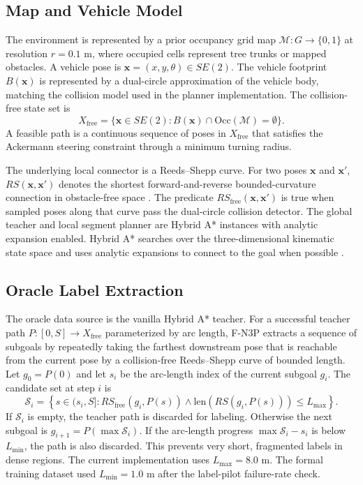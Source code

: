 \documentclass[11pt,a4paper]{article}
\begin{document}
\subsection{Map and Vehicle Model}
\label{sec:method_model}

The environment is represented by a prior occupancy grid map $\mathcal{M}: G \rightarrow \{0,1\}$ at resolution $r=0.1$ m, where occupied cells represent tree trunks or mapped obstacles. A vehicle pose is $\mathbf{x}=(x,y,\theta)\in SE(2)$. The vehicle footprint $B(\mathbf{x})$ is represented by a dual-circle approximation of the vehicle body, matching the collision model used in the planner implementation. The collision-free state set is
\begin{equation}
X_{\mathrm{free}} = \{\mathbf{x}\in SE(2): B(\mathbf{x})\cap \mathrm{Occ}(\mathcal{M})=\emptyset\}.
\end{equation}
A feasible path is a continuous sequence of poses in $X_{\mathrm{free}}$ that satisfies the Ackermann steering constraint through a minimum turning radius.

The underlying local connector is a Reeds--Shepp curve. For two poses $\mathbf{x}$ and $\mathbf{x}'$, $RS(\mathbf{x},\mathbf{x}')$ denotes the shortest forward-and-reverse bounded-curvature connection in obstacle-free space \cite{ReedsShepp1990}. The predicate $RS_{\mathrm{free}}(\mathbf{x},\mathbf{x}')$ is true when sampled poses along that curve pass the dual-circle collision detector. The global teacher and local segment planner are Hybrid A* instances with analytic expansion enabled. Hybrid A* searches over the three-dimensional kinematic state space and uses analytic expansions to connect to the goal when possible \cite{Dolgov2010HybridAstar}.

\subsection{Oracle Label Extraction}
\label{sec:method_labels}

The oracle data source is the vanilla Hybrid A* teacher. For a successful teacher path $P:[0,S]\rightarrow X_{\mathrm{free}}$ parameterized by arc length, F-N3P extracts a sequence of subgoals by repeatedly taking the farthest downstream pose that is reachable from the current pose by a collision-free Reeds--Shepp curve of bounded length. Let $g_0=P(0)$ and let $s_i$ be the arc-length index of the current subgoal $g_i$. The candidate set at step $i$ is
\begin{equation}
\mathcal{S}_i =
\left\{
s\in(s_i,S] :
RS_{\mathrm{free}}(g_i,P(s)) \land
\mathrm{len}(RS(g_i,P(s))) \le L_{\max}
\right\}.
\end{equation}
If $\mathcal{S}_i$ is empty, the teacher path is discarded for labeling. Otherwise the next subgoal is $g_{i+1}=P(\max \mathcal{S}_i)$. If the arc-length progress $\max \mathcal{S}_i-s_i$ is below $L_{\min}$, the path is also discarded. This prevents very short, fragmented labels in dense regions. The current implementation uses $L_{\max}=8.0$ m. The formal training dataset used $L_{\min}=1.0$ m after the label-pilot failure-rate check.
\end{document}
